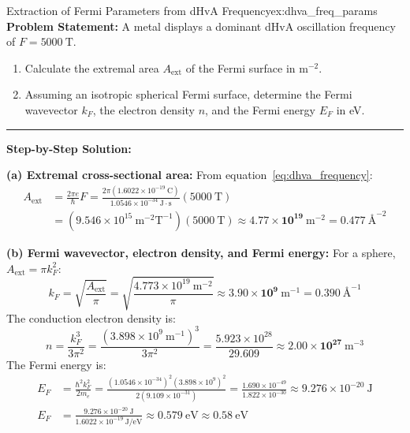\documentclass[11pt,a4paper]{article}
\begin{document}
\begin{examplebox}{Extraction of Fermi Parameters from dHvA Frequency}{ex:dhva_freq_params}
\textbf{Problem Statement:}
A metal displays a dominant dHvA oscillation frequency of $F = 5000\ \mathrm{T}$.
\begin{enumerate}[label=(\alph*)]
    \item Calculate the extremal area $A_{\mathrm{ext}}$ of the Fermi surface in $\mathrm{m}^{-2}$.
    \item Assuming an isotropic spherical Fermi surface, determine the Fermi wavevector $k_F$, the electron density $n$, and the Fermi energy $E_F$ in eV.
\end{enumerate}

\vspace{0.2cm}\hrule\vspace{0.2cm}
\textbf{Step-by-Step Solution:}

\textbf{(a) Extremal cross-sectional area:}
From equation~\eqref{eq:dhva_frequency}:
\begin{align*}
A_{\mathrm{ext}} &= \frac{2\pi e}{\hbar}F = \frac{2\pi(1.6022 \times 10^{-19}\ \mathrm{C})}{1.0546 \times 10^{-34}\ \mathrm{J\cdot s}}(5000\ \mathrm{T}) \\
&= (9.546 \times 10^{15}\ \mathrm{m^{-2}T^{-1}})(5000\ \mathrm{T}) \approx \mathbf{4.77 \times 10^{19}\ \mathrm{m^{-2}}} = 0.477\ \text{\AA}^{-2}
\end{align*}

\textbf{(b) Fermi wavevector, electron density, and Fermi energy:}
For a sphere, $A_{\mathrm{ext}} = \pi k_F^2$:
\[
k_F = \sqrt{\frac{A_{\mathrm{ext}}}{\pi}} = \sqrt{\frac{4.773 \times 10^{19}\ \mathrm{m^{-2}}}{\pi}} \approx \mathbf{3.90 \times 10^9\ \mathrm{m^{-1}}} = 0.390\ \text{\AA}^{-1}
\]
The conduction electron density is:
\[
n = \frac{k_F^3}{3\pi^2} = \frac{(3.898 \times 10^9\ \mathrm{m^{-1}})^3}{3\pi^2} = \frac{5.923 \times 10^{28}}{29.609} \approx \mathbf{2.00 \times 10^{27}\ \mathrm{m^{-3}}}
\]
The Fermi energy is:
\begin{align*}
E_F &= \frac{\hbar^2 k_F^2}{2m_e} = \frac{(1.0546 \times 10^{-34})^2 (3.898 \times 10^9)^2}{2(9.109 \times 10^{-31})} = \frac{1.690 \times 10^{-49}}{1.822 \times 10^{-30}} \approx 9.276 \times 10^{-20}\ \mathrm{J} \\
E_F &= \frac{9.276 \times 10^{-20}\ \mathrm{J}}{1.6022 \times 10^{-19}\ \mathrm{J/eV}} \approx \mathbf{0.579\ \mathrm{eV}} \approx \mathbf{0.58\ \mathrm{eV}}
\end{align*}
\end{examplebox}
\end{document}
